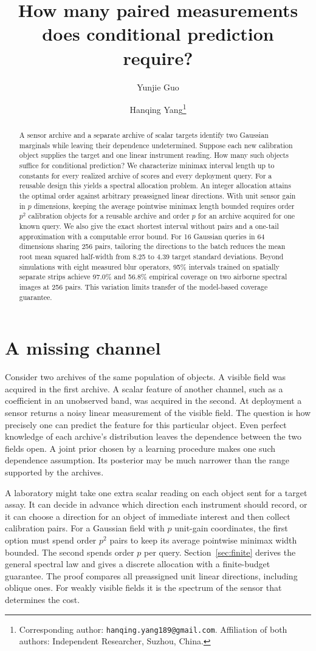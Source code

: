 \documentclass[11pt]{article}
\title{How many paired measurements does conditional prediction require?}
\author{Yunjie Guo \and Hanqing Yang\thanks{Corresponding author: \texttt{hanqing.yang189@gmail.com}. Affiliation of both authors: Independent Researcher, Suzhou, China.}}
\date{}
\begin{document}
\maketitle
\begin{abstract}
A sensor archive and a separate archive of scalar targets identify two Gaussian marginals while leaving their dependence undetermined. Suppose each new calibration object supplies the target and one linear instrument reading. How many such objects suffice for conditional prediction? We characterize minimax interval length up to constants for every realized archive of scores and every deployment query. For a reusable design this yields a spectral allocation problem. An integer allocation attains the optimal order against arbitrary preassigned linear directions. With unit sensor gain in $p$ dimensions, keeping the average pointwise minimax length bounded requires order $p^2$ calibration objects for a reusable archive and order $p$ for an archive acquired for one known query. We also give the exact shortest interval without pairs and a one-tail approximation with a computable error bound. For 16 Gaussian queries in 64 dimensions sharing 256 pairs, tailoring the directions to the batch reduces the mean root mean squared half-width from 8.25 to 4.39 target standard deviations. Beyond simulations with eight measured blur operators, 95\% intervals trained on spatially separate strips achieve 97.0\% and 56.8\% empirical coverage on two airborne spectral images at 256 pairs. This variation limits transfer of the model-based coverage guarantee.
\end{abstract}

\section{A missing channel}
Consider two archives of the same population of objects. A visible field was acquired in the first archive. A scalar feature of another channel, such as a coefficient in an unobserved band, was acquired in the second. At deployment a sensor returns a noisy linear measurement of the visible field. The question is how precisely one can predict the feature for this particular object. Even perfect knowledge of each archive's distribution leaves the dependence between the two fields open. A joint prior chosen by a learning procedure makes one such dependence assumption. Its posterior may be much narrower than the range supported by the archives.

A laboratory might take one extra scalar reading on each object sent for a target assay. It can decide in advance which direction each instrument should record, or it can choose a direction for an object of immediate interest and then collect calibration pairs. For a Gaussian field with $p$ unit-gain coordinates, the first option must spend order $p^2$ pairs to keep its average pointwise minimax width bounded. The second spends order $p$ per query. Section~\ref{sec:finite} derives the general spectral law and gives a discrete allocation with a finite-budget guarantee. The proof compares all preassigned unit linear directions, including oblique ones. For weakly visible fields it is the spectrum of the sensor that determines the cost.
\end{document}
